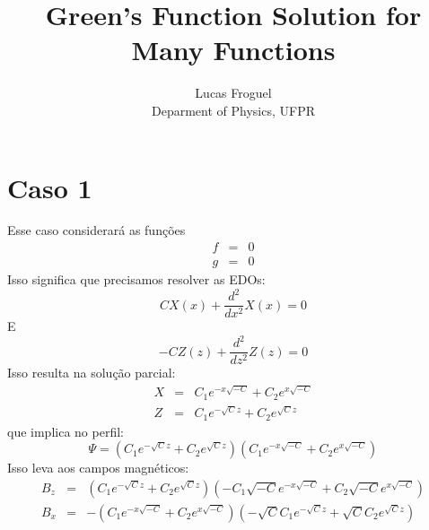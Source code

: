 \documentclass[12pt]{article}
\title{Green's Function Solution for Many Functions}
\author{Lucas Froguel\\Deparment of Physics, UFPR}
\def\be{\begin{equation}}
\def\ee{\end{equation}}
\def\bea{\begin{eqnarray*}}
\def\eea{\end{eqnarray*}}
\theoremstyle{definition}
\numberwithin{equation}{section}
\begin{document}
\maketitle



        \section{Caso 1}
        Esse caso considerará as funções
        \bea
            f &=& 0 \\
            g &=& 0
        \eea
        Isso significa que precisamos resolver as EDOs:
        \be
            C X{\left(x \right)} + \frac{d^{2}}{d x^{2}} X{\left(x \right)} = 0
        \ee
        E
        \be
            - C Z{\left(z \right)} + \frac{d^{2}}{d z^{2}} Z{\left(z \right)} = 0
        \ee
        Isso resulta na solução parcial:
        \bea
            X &=& C_{1} e^{- x \sqrt{- C}} + C_{2} e^{x \sqrt{- C}} \\
            Z &=& C_{1} e^{- \sqrt{C} z} + C_{2} e^{\sqrt{C} z}
        \eea
        que implica no perfil:
        \be
            \Psi = \left(C_{1} e^{- \sqrt{C} z} + C_{2} e^{\sqrt{C} z}\right) \left(C_{1} e^{- x \sqrt{- C}} + C_{2} e^{x \sqrt{- C}}\right)
        \ee
        Isso leva aos campos magnéticos:
        \bea
            B_z &=& \left(C_{1} e^{- \sqrt{C} z} + C_{2} e^{\sqrt{C} z}\right) \left(- C_{1} \sqrt{- C} e^{- x \sqrt{- C}} + C_{2} \sqrt{- C} e^{x \sqrt{- C}}\right)\\
            B_x &=& - \left(C_{1} e^{- x \sqrt{- C}} + C_{2} e^{x \sqrt{- C}}\right) \left(- \sqrt{C} C_{1} e^{- \sqrt{C} z} + \sqrt{C} C_{2} e^{\sqrt{C} z}\right)
        \eea
        
\end{document}
